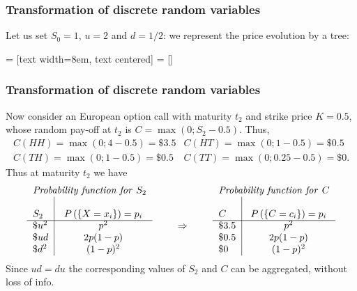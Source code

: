 \documentclass[notes=show,smaller,handout]{beamer}
\renewcommand{\Pr}{P}
\begin{document}
\begin{frame}%
\frametitle{Transformation of discrete random variables}
\begin{example}[cont'd]
Let us set $S_0=1$, $u=2$ and $d=1/2$: we represent the price evolution by a tree:


%
 = [text width=8em, text centered]
 = []
\end{example}
\end{frame}%



\begin{frame}%
\frametitle{Transformation of discrete random variables}
\begin{example}[cont'd]
Now consider an European option call with maturity $t_2$ and strike price $K=0.5$, whose random pay-off at $t_2$ is $C=\max(0;S_2-0.5)$. Thus, 
\begin{eqnarray*}
C(HH)=\max(0;4-0.5)=\$ 3.5 & C(HT)=\max(0;1-0.5)=\$ 0.5 \\
C(TH)=\max(0;1-0.5)=\$ 0.5 & C(TT)=\max(0;0.25-0.5)=\$ 0.
\end{eqnarray*}
Thus at maturity $t_2$ we have
\begin{equation*}
\begin{tabular}{l|cll|c}
\multicolumn{2}{l}{\emph{Probability function for }$S_2$} &  & 
\multicolumn{2}{l}{\emph{Probability function for }$C$} \\ 
&  &  &  &  \\ 
$S_2$ & $\Pr \left(\{ X=x_{i} \}\right) =p_{i}$ &  & $C$ & $\Pr \left(\{
C=c_{i}  \}\right) =p_{i}$ \\ \cline{1-2}\cline{4-5}
$\$ u^2$ & $p^2$ & $\qquad \Rightarrow \qquad $ & $\$ 3.5$ & $p^2$
\\ 
$\$ ud$ & $2p(1-p)$ &  & $\$ 0.5$ & $2p(1-p)$ \\ 
$\$ d^2$ & $(1-p)^2$  &  & $\$ 0$ & $(1-p)^2$%
\end{tabular}%
\end{equation*}
\tiny{Since $ud=du$ the corresponding values of $S_2$ and $C$ can be aggregated, without loss of info.}



\end{example}
\end{frame}%
\end{document}

